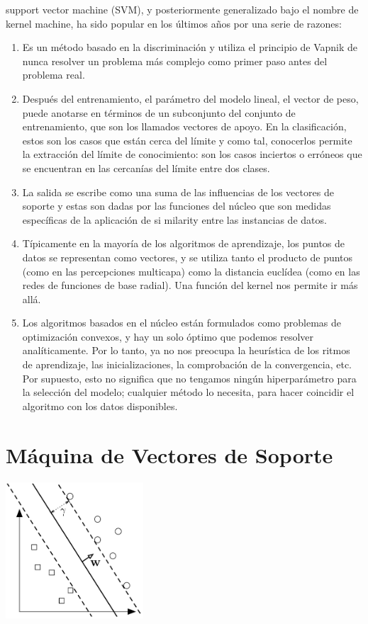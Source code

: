 support vector machine (SVM), y posteriormente generalizado bajo el nombre de kernel machine, ha sido popular en los últimos años por una serie de razones: 
\begin{enumerate}
\item Es un método basado en la discriminación y utiliza el principio de Vapnik de nunca resolver un problema más complejo como primer paso antes del problema real. 
\item Después del entrenamiento, el parámetro del modelo lineal, el vector de peso, puede anotarse en términos de un subconjunto del conjunto de entrenamiento, que son los llamados vectores de apoyo. En la clasificación, estos son los casos que están cerca del límite y como tal, conocerlos permite la extracción del límite de conocimiento: son los casos inciertos o erróneos que se encuentran en las cercanías del límite entre dos clases.  
\item La salida se escribe como una suma de las influencias de los vectores de soporte y estas son dadas por las funciones del núcleo que son medidas específicas de la aplicación de si milarity entre las instancias de datos. 
\item Típicamente en la mayoría de los algoritmos de aprendizaje, los puntos de datos se representan como vectores, y se utiliza tanto el producto de puntos (como en las percepciones multicapa) como la distancia euclídea (como en las redes de funciones de base radial).  Una función del kernel nos permite ir más allá. 
\item Los algoritmos basados en el núcleo están formulados como problemas de optimización convexos, y hay un solo óptimo que podemos resolver analíticamente. Por lo tanto, ya no nos preocupa la heurística de los ritmos de aprendizaje, las inicializaciones, la comprobación de la convergencia, etc.   Por supuesto, esto no significa que no tengamos ningún hiperparámetro para la selección del modelo; cualquier método lo necesita, para hacer coincidir el algoritmo con los datos disponibles.
\end{enumerate}

\section{Máquina de Vectores de Soporte}

\begin{center}
\includegraphics[height=2.0in]{figuras/Capture1.PNG}
\end{center}

